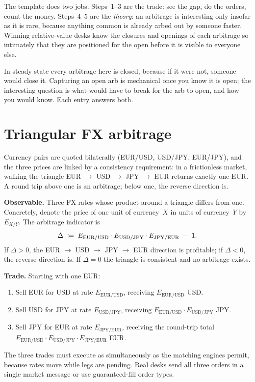 \begin{intuitionbox}
The template does two jobs. Steps~1--3 are the trade: see the
gap, do the orders, count the money. Steps~4--5 are the
\emph{theory}: an arbitrage is interesting only insofar as it is
rare, because anything common is already arbed out by someone
faster. Winning relative-value desks know the closures and
openings of each arbitrage so intimately that they are
positioned for the open before it is visible to everyone else.
\end{intuitionbox}

In steady state every arbitrage here is closed, because if it
were not, someone would close it. Capturing an open arb is
mechanical once you know it is open; the interesting question
is what would have to break for the arb to open, and how you
would know. Each entry answers both.

\section{Triangular FX arbitrage}
\label{sec:ch13_triangular}

Currency pairs are quoted bilaterally (EUR/USD, USD/JPY,
EUR/JPY), and the three prices are linked by a consistency
requirement: in a frictionless market, walking the triangle EUR
$\to$ USD $\to$ JPY $\to$ EUR returns exactly one EUR. A round
trip above one is an arbitrage; below one, the reverse direction
is.

\textbf{Observable.} Three FX rates whose product around a
triangle differs from one. Concretely, denote the price of one
unit of currency~$X$ in units of currency~$Y$ by $E_{X/Y}$. The
arbitrage indicator is
\begin{equation}
  \Delta \;\coloneqq\; E_{\text{EUR}/\text{USD}} \cdot
  E_{\text{USD}/\text{JPY}} \cdot E_{\text{JPY}/\text{EUR}}
  \;-\; 1.
  \label{eq:triangular_indicator}
\end{equation}
If $\Delta > 0$, the EUR $\to$ USD $\to$ JPY $\to$ EUR direction
is profitable; if $\Delta < 0$, the reverse direction is. If
$\Delta = 0$ the triangle is consistent and no arbitrage exists.

\textbf{Trade.} Starting with one EUR:
\begin{enumerate}
  \item Sell EUR for USD at rate $E_{\text{EUR}/\text{USD}}$,
  receiving $E_{\text{EUR}/\text{USD}}$ USD.
  \item Sell USD for JPY at rate $E_{\text{USD}/\text{JPY}}$,
  receiving $E_{\text{EUR}/\text{USD}} \cdot
  E_{\text{USD}/\text{JPY}}$ JPY.
  \item Sell JPY for EUR at rate $E_{\text{JPY}/\text{EUR}}$,
  receiving the round-trip total
  $E_{\text{EUR}/\text{USD}} \cdot E_{\text{USD}/\text{JPY}}
  \cdot E_{\text{JPY}/\text{EUR}}$ EUR.
\end{enumerate}
The three trades must execute as simultaneously as the matching
engines permit, because rates move while legs are pending. Real
desks send all three orders in a single market message or use
guaranteed-fill order types.

